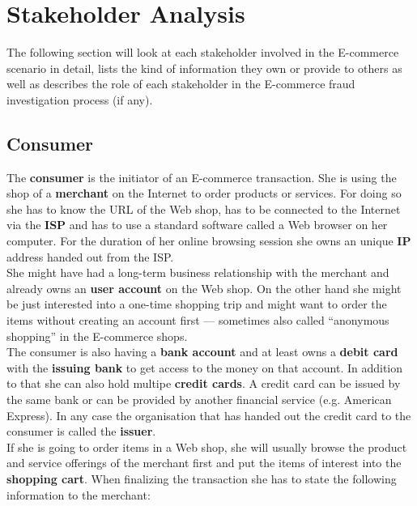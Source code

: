 
\section{Stakeholder Analysis}
\label{sec:stakeholder_analysis}

The following section will look at each stakeholder involved in the E-commerce scenario in detail, lists the kind of information they own or provide to others as well as describes the role of each stakeholder in the E-commerce fraud investigation process (if any).

\subsection{Consumer}
\label{subsec:stakeholder_consumer}

The \textbf{consumer} is the initiator of an E-commerce transaction. She is using the shop of a \textbf{merchant} on the Internet to order products or services. For doing so she has to know the \gls{URL} of the Web shop, has to be connected to the Internet via the \textbf{\gls{ISP}} and has to use a standard software called a Web browser on her computer. For the duration of her online browsing session she owns an unique \textbf{\gls{IP}} address handed out from the \gls{ISP}.\\

She might have had a long-term business relationship with the merchant and already owns an \textbf{user account} on the Web shop. On the other hand she might be just interested into a one-time shopping trip and might want to order the items without creating an account first --- sometimes also called ``anonymous shopping'' in the E-commerce shops. \\

The consumer is also having a \textbf{bank account} and at least owns a \textbf{debit card} with the \textbf{issuing bank} to get access to the money on that account. In addition to that she can also hold multipe \textbf{credit cards}. A credit card can be issued by the same bank or can be provided by another financial service (e.g. American Express). In any case the organisation that has handed out the credit card to the consumer is called the \textbf{issuer}. \\

If she is going to order items in a Web shop, she will usually browse the product and service offerings of the merchant first and put the items of interest into the \textbf{shopping cart}. When finalizing the transaction she has to state the following information to the merchant:\@

